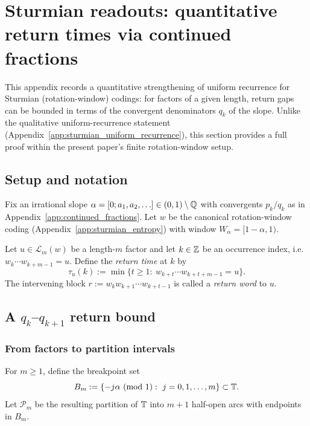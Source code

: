 \section{Sturmian readouts: quantitative return times via continued fractions}
\label{app:sturmian_return_times_qk}
\noindent
This appendix records a quantitative strengthening of uniform recurrence for Sturmian (rotation-window) codings:
for factors of a given length, return gaps can be bounded in terms of the convergent denominators $q_k$ of the slope.
Unlike the qualitative uniform-recurrence statement (Appendix~\ref{app:sturmian_uniform_recurrence}), this section provides a full proof within the present paper's finite rotation-window setup.

\subsection{Setup and notation}
\label{subsec:sturmian_return_setup}

\MathTag Fix an irrational slope $\alpha=[0;a_1,a_2,\ldots]\in(0,1)\setminus\mathbb{Q}$ with convergents $p_k/q_k$ as in Appendix~\ref{app:continued_fractions}.
Let $w$ be the canonical rotation-window coding (Appendix~\ref{app:sturmian_entropy}) with window $W_\alpha=[1-\alpha,1)$.

\begin{definition}\label{def:sturmian_return_time_word}
\MathTag Let $u\in\mathcal{L}_m(w)$ be a length-$m$ factor and let $k\in\mathbb{Z}$ be an occurrence index, i.e.\ $w_k\cdots w_{k+m-1}=u$.
Define the \emph{return time} at $k$ by
\[
\tau_u(k):=\min\{t\ge 1:\ w_{k+t}\cdots w_{k+t+m-1}=u\}.
\]
The intervening block $r:=w_k w_{k+1}\cdots w_{k+t-1}$ is called a \emph{return word} to $u$.
\end{definition}

\subsection{A $q_k$--$q_{k+1}$ return bound}
\label{subsec:sturmian_return_bound_qk}

\subsubsection{From factors to partition intervals}
\label{subsubsec:sturmian_factor_interval_dictionary}

\begin{definition}\label{def:breakpoint_partition_Bm}
\MathTag For $m\ge 1$, define the breakpoint set
\[
B_m:=\{-j\alpha\ (\mathrm{mod}\ 1):\ j=0,1,\ldots,m\}\subset\TT.
\]
Let $\mathcal{P}_m$ be the resulting partition of $\mathbb{T}$ into $m+1$ half-open arcs with endpoints in $B_m$.
\end{definition}

